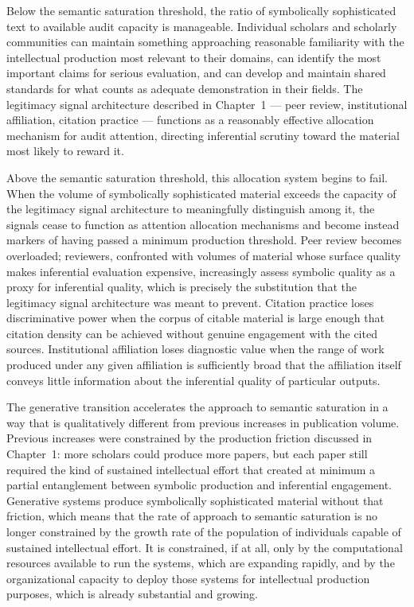 \documentclass[12pt, openright, twoside]{book}
\begin{document}
Below the semantic saturation threshold, the ratio of symbolically
sophisticated text to available audit capacity is manageable. Individual
scholars and scholarly communities can maintain something approaching
reasonable familiarity with the intellectual production most relevant
to their domains, can identify the most important claims for serious
evaluation, and can develop and maintain shared standards for what
counts as adequate demonstration in their fields. The legitimacy
signal architecture described in Chapter~1 --- peer review, institutional
affiliation, citation practice --- functions as a reasonably effective
allocation mechanism for audit attention, directing inferential scrutiny
toward the material most likely to reward it.

Above the semantic saturation threshold, this allocation system begins
to fail. When the volume of symbolically sophisticated material exceeds
the capacity of the legitimacy signal architecture to meaningfully
distinguish among it, the signals cease to function as attention
allocation mechanisms and become instead markers of having passed a
minimum production threshold. Peer review becomes overloaded; reviewers,
confronted with volumes of material whose surface quality makes
inferential evaluation expensive, increasingly assess symbolic quality
as a proxy for inferential quality, which is precisely the substitution
that the legitimacy signal architecture was meant to prevent. Citation
practice loses discriminative power when the corpus of citable material
is large enough that citation density can be achieved without genuine
engagement with the cited sources. Institutional affiliation loses
diagnostic value when the range of work produced under any given
affiliation is sufficiently broad that the affiliation itself conveys
little information about the inferential quality of particular outputs.

The generative transition accelerates the approach to semantic
saturation in a way that is qualitatively different from previous
increases in publication volume. Previous increases were constrained
by the production friction discussed in Chapter~1: more scholars
could produce more papers, but each paper still required the kind
of sustained intellectual effort that created at minimum a partial
entanglement between symbolic production and inferential engagement.
Generative systems produce symbolically sophisticated material without
that friction, which means that the rate of approach to semantic
saturation is no longer constrained by the growth rate of the
population of individuals capable of sustained intellectual effort.
It is constrained, if at all, only by the computational resources
available to run the systems, which are expanding rapidly, and by
the organizational capacity to deploy those systems for intellectual
production purposes, which is already substantial and growing.
\end{document}
